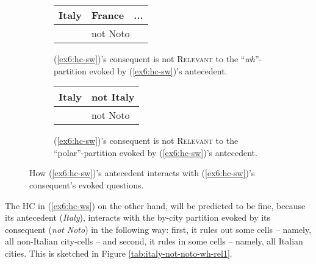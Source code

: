 \begin{figure}[H]
	\centering
	\begin{subfigure}[t]{.47\linewidth}
		\centering
		\begin{tabular}{llll|}
			\hline
			\multicolumn{2}{|l|}{Italy} & \multicolumn{1}{l|}{France} & ... \\ \hline
			\multicolumn{1}{l|}{}   & \multicolumn{3}{l|}{\cellcolor{orange!20!white}not Noto}         \\ \cline{2-4} 
		\end{tabular}
		\caption[]{(\ref{ex6:hc-sw})'s consequent is not \textsc{Relevant} to the ``\textit{wh}''-partition evoked by (\ref{ex6:hc-sw})'s antecedent.}\label{tab:not-noto-italy-wh-rel1}
	\end{subfigure}
	\hfill
	\begin{subfigure}[t]{.47\linewidth}
		\centering
		\begin{tabular}{llll|}
			\hline
			\multicolumn{2}{|l|}{Italy} & \multicolumn{2}{l|}{not Italy} \\ \hline
			\multicolumn{1}{l|}{}   & \multicolumn{3}{l|}{\cellcolor{orange!20!white}not Noto}      \\ \cline{2-4} 
		\end{tabular}
		\caption[]{(\ref{ex6:hc-sw})'s consequent is not \textsc{Relevant} to the ``polar''-partition evoked by (\ref{ex6:hc-sw})'s antecedent.}\label{tab:not-noto-italy-polar-rel1}
	\end{subfigure}
	\caption[]{How (\ref{ex6:hc-sw})'s antecedent interacts with (\ref{ex6:hc-sw})'s consequent's evoked questions.}
\end{figure}

The HC in (\ref{ex6:hc-ws}) on the other hand, will be predicted to be fine, because its antecedent (\textit{Italy}), interacts with the by-city partition evoked by its consequent (\textit{not Noto}) in the following way: first, it rules out some cells -- namely, all non-Italian city-cells -- and second, it rules in some cells -- namely, all Italian cities. This is sketched in Figure \ref{tab:italy-not-noto-wh-rel1}. 

